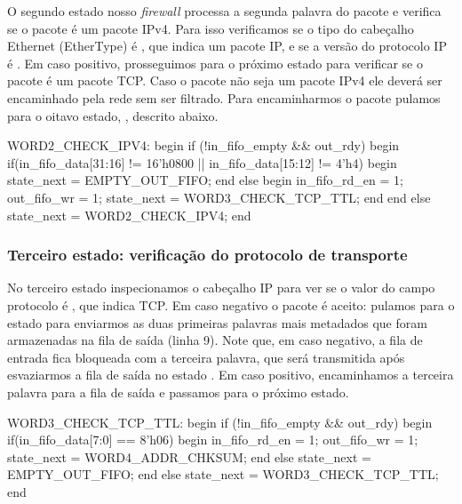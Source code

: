 O segundo estado nosso \emph{firewall} processa a segunda palavra do
pacote e verifica se o pacote é um pacote IPv4.  Para isso verificamos
se o tipo do cabeçalho Ethernet (EtherType) é , que indica
um pacote IP, e se a versão do protocolo IP é .\footnotemark{}
Em caso positivo, prosseguimos para o próximo estado para verificar se o
pacote é um pacote TCP.  Caso o pacote não seja um pacote IPv4 ele
deverá ser encaminhado pela rede sem ser filtrado.  Para encaminharmos o
pacote pulamos para o oitavo estado, , descrito
abaixo.


\begin{verilogcode}
  WORD2_CHECK_IPV4: begin
     if (!in_fifo_empty && out_rdy) begin
        if(in_fifo_data[31:16] != 16'h0800 ||
              in_fifo_data[15:12] != 4'h4) begin
           state_next = EMPTY_OUT_FIFO;
        end
        else begin
           in_fifo_rd_en = 1;
           out_fifo_wr = 1;
           state_next = WORD3_CHECK_TCP_TTL;
        end
     end
     else
        state_next = WORD2_CHECK_IPV4;
  end
\end{verilogcode}

\subsubsection*{Terceiro estado: verificação do protocolo de transporte}

No terceiro estado inspecionamos o cabeçalho IP para ver se o valor do
campo protocolo é , que indica TCP.  Em caso negativo o pacote
é aceito: pulamos para o estado  para enviarmos as
duas primeiras palavras mais metadados que foram armazenadas na fila de
saída (linha 9).  Note que, em caso negativo, a fila de entrada fica
bloqueada com a terceira palavra, que será transmitida após esvaziarmos
a fila de saída no estado .  Em caso positivo,
encaminhamos a terceira palavra para a fila de saída e passamos para o
próximo estado.

\begin{verilogcode}
  WORD3_CHECK_TCP_TTL: begin
     if (!in_fifo_empty && out_rdy) begin
        if(in_fifo_data[7:0] == 8'h06) begin
           in_fifo_rd_en = 1;
           out_fifo_wr = 1;
           state_next = WORD4_ADDR_CHKSUM;
        end
        else
           state_next = EMPTY_OUT_FIFO;
     end
     else
        state_next = WORD3_CHECK_TCP_TTL;
  end
\end{verilogcode}


